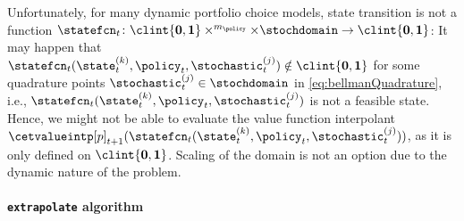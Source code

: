 Unfortunately, for many dynamic portfolio choice models,
state transition is not a function
$\statefcn_t\colon \clint{\*0, \*1} \times \real^{m_{\policy}} \times
\stochdomain \to \clint{\*0, \*1}$:
It may happen that
$\statefcn_t(\state_t^{(k)}, \policy_t, \stochastic_t^{(j)})
\notin \clint{\*0, \*1}$
for some quadrature points
$\stochastic_t^{(j)} \in \stochdomain$ in \eqref{eq:bellmanQuadrature},
i.e., $\statefcn_t(\state_t^{(k)}, \policy_t, \stochastic_t^{(j)})$
is not a feasible state.
Hence, we might not be able to evaluate the value function interpolant
$\cetvalueintp[p]_{t+1}(
  \statefcn_t(\state_t^{(k)}, \policy_t, \stochastic_t^{(j)})
)$, as it is only defined on $\clint{\*0, \*1}$.
Scaling of the domain is not an option due to the dynamic nature of
the problem.

\paragraph{\texttt{extrapolate} algorithm}


